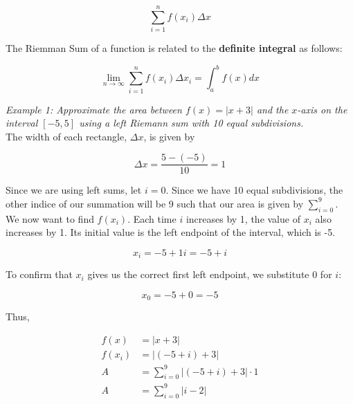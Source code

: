         \begin{equation*}
            \sum_{i=1}^n f(x_i)\Delta x
        \end{equation*}

        \noindent The Riemman Sum of a function is related to the \textbf{definite integral} as
        follows:

        \begin{equation*}
            \lim_{n\rightarrow\infty}\sum^n_{i=1}f(x_i)\Delta x_i = \int^b_a f(x)dx
        \end{equation*}

        \noindent \color{blue} \textit{Example 1: Approximate the area between $f(x)=|x+3|$ and
        the $x$-axis on the interval $[-5,5]$ using a left Riemann sum with 10 equal subdivisions.}
        \color{black} \\

        \noindent The width of each rectangle, $\Delta x$, is given by

        \begin{equation*}
            \Delta x = \frac{5-(-5)}{10} = 1
        \end{equation*}

        \noindent Since we are using left sums, let $i=0$. Since we have 10 equal subdivisions, the other
        indice of our summation will be 9 such that our area is given by $\sum^9_{i=0}$. We now
        want to find $f(x_i)$. Each time $i$ increases by 1, the value of $x_i$ also increases
        by 1. Its initial value is the left endpoint of the interval, which is -5.

        \begin{equation*}
            x_i = -5 + 1i = -5 + i
        \end{equation*}

        \noindent To confirm that $x_i$ gives us the correct first left endpoint, we substitute 0 for $i$:

        \begin{equation*}
            x_0=-5+0=-5
        \end{equation*}

        \noindent Thus,

        \begin{align*}
            f(x)    &= |x+3| \\
            f(x_i)  &= |(-5+i) +3| \\
            A       &= \sum_{i=0}^9 |(-5+i) + 3| \cdot 1 \\
            A       &= \sum_{i=0}^9 |i-2|
        \end{align*}

